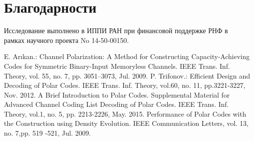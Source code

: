 \documentclass{llncs}
\begin{document}
\section*{Благодарности}
Исследование выполнено в ИППИ РАН при финансовой поддержке РНФ в рамках научного проекта No 14-50-00150.

\begin{thebibliography}{99}
 {E. Arıkan.:} Channel Polarization: A Method for Constructing
Capacity-Achieving Codes for Symmetric
Binary-Input Memoryless Channels. IEEE
Trans. Inf. Theory, vol. 55, no. 7, pp. 3051–3073, Jul. 2009.
 {P. Trifonov.:} Efficient Design and Decoding of Polar Codes. IEEE
Trans. Inf. Theory, vol.60, no. 11, pp.3221-3227, Nov. 2012.
 A Brief Introduction to Polar Codes. Supplemental Material for Advanced Channel Coding
 List Decoding of Polar Codes.  IEEE
Trans. Inf. Theory, vol.1, no. 5, pp. 2213-2226, May. 2015.
 Performance of Polar Codes with the Construction using Density Evolution. IEEE Communication Letters, vol. 13, no. 7,pp. 519 -521, Jul. 2009.

\end{thebibliography}
\end{document}
